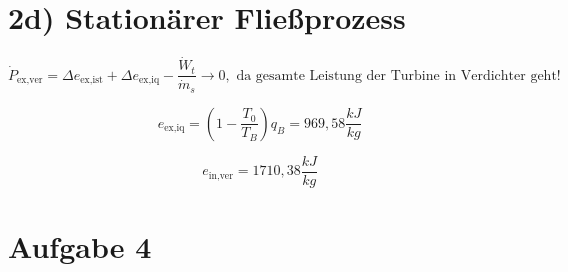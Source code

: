 \section*{2d) Stationärer Fließprozess}

\[
\dot{P}_{\text{ex,ver}} = \Delta e_{\text{ex,ist}} + \Delta e_{\text{ex,iq}} - \frac{\dot{W}_t}{\dot{m}_s} \rightarrow 0, \text{ da gesamte Leistung der Turbine in Verdichter geht!}
\]

\[
e_{\text{ex,iq}} = \left(1 - \frac{T_0}{T_B}\right) q_B = 969,58 \frac{kJ}{kg}
\]

\[
e_{\text{in,ver}} = 1710,38 \frac{kJ}{kg}
\]

\section*{Aufgabe 4}